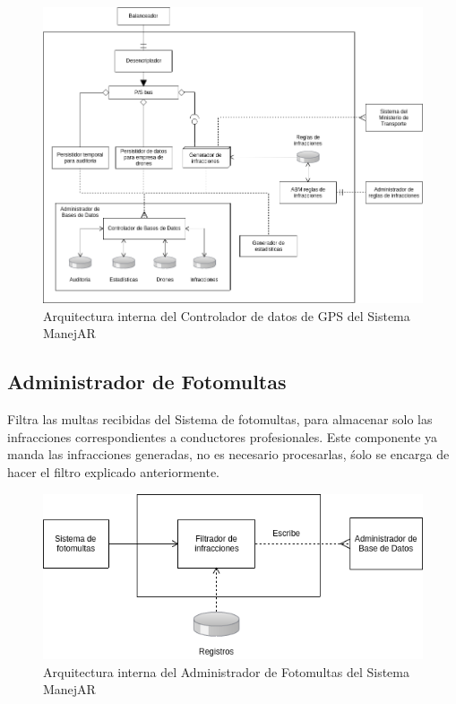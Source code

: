 \begin{figure}
\centerline{\includegraphics[width=1\textwidth]{./imagenes/arquitectura_tp2/controlador_datos_gps.png}}
\caption{Arquitectura interna del Controlador de datos de GPS del Sistema ManejAR}
\end{figure}


\subsection{Administrador de Fotomultas}
Filtra las multas recibidas del Sistema de fotomultas, para almacenar solo las 
infracciones correspondientes a conductores profesionales.
Este componente ya manda las infracciones generadas, no es necesario procesarlas,
śolo se encarga de hacer el filtro explicado anteriormente.

\begin{figure}[H]
  \centering
    \includegraphics[width=1\textwidth]{./imagenes/arquitectura_tp2/administrador_fotomultas.png}
  \caption{Arquitectura interna del Administrador de Fotomultas del Sistema ManejAR}
\end{figure}


